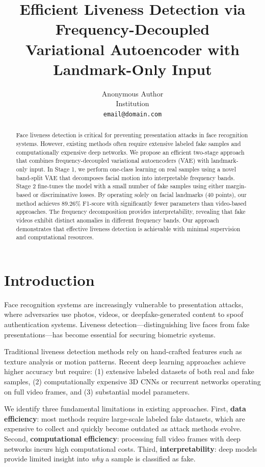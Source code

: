 \documentclass[11pt,twocolumn]{article}
\title{\textbf{Efficient Liveness Detection via Frequency-Decoupled \\ Variational Autoencoder with Landmark-Only Input}}
\author{
Anonymous Author \\
Institution \\
\texttt{email@domain.com}
}
\date{}
\begin{document}
\maketitle

\begin{abstract}
Face liveness detection is critical for preventing presentation attacks in face recognition systems. However, existing methods often require extensive labeled fake samples and computationally expensive deep networks. We propose an efficient two-stage approach that combines frequency-decoupled variational autoencoders (VAE) with landmark-only input. In Stage 1, we perform one-class learning on real samples using a novel band-split VAE that decomposes facial motion into interpretable frequency bands. Stage 2 fine-tunes the model with a small number of fake samples using either margin-based or discriminative losses. By operating solely on facial landmarks (40 points), our method achieves $89.26\%$ F1-score with significantly fewer parameters than video-based approaches. The frequency decomposition provides interpretability, revealing that fake videos exhibit distinct anomalies in different frequency bands. Our approach demonstrates that effective liveness detection is achievable with minimal supervision and computational resources.
\end{abstract}

\section{Introduction}
\label{sec:intro}

Face recognition systems are increasingly vulnerable to presentation attacks, where adversaries use photos, videos, or deepfake-generated content to spoof authentication systems. Liveness detection—distinguishing live faces from fake presentations—has become essential for securing biometric systems.

Traditional liveness detection methods rely on hand-crafted features such as texture analysis or motion patterns. Recent deep learning approaches achieve higher accuracy but require: (1) extensive labeled datasets of both real and fake samples, (2) computationally expensive 3D CNNs or recurrent networks operating on full video frames, and (3) substantial model parameters.

We identify three fundamental limitations in existing approaches. First, \textbf{data efficiency}: most methods require large-scale labeled fake datasets, which are expensive to collect and quickly become outdated as attack methods evolve. Second, \textbf{computational efficiency}: processing full video frames with deep networks incurs high computational costs. Third, \textbf{interpretability}: deep models provide limited insight into \emph{why} a sample is classified as fake.
\end{document}
